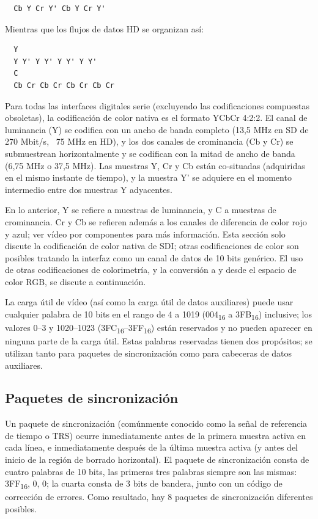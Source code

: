   \begin{verbatim}
  Cb Y Cr Y' Cb Y Cr Y'
  \end{verbatim}

  Mientras que los flujos de datos HD se organizan así:

  \begin{verbatim}
  Y
  Y Y' Y Y' Y Y' Y Y'
  C
  Cb Cr Cb Cr Cb Cr Cb Cr
  \end{verbatim}

  Para todas las interfaces digitales serie (excluyendo las codificaciones compuestas
  obsoletas), la codificación de color nativa es el formato YCbCr 4:2:2. El canal de
  luminancia (Y) se codifica con un ancho de banda completo (13,5 MHz en SD de 270 Mbit/s,
  ~75 MHz en HD), y los dos canales de crominancia (Cb y Cr) se submuestrean horizontalmente
  y se codifican con la mitad de ancho de banda (6,75 MHz o 37,5 MHz). Las muestras Y, Cr y
  Cb están co-situadas (adquiridas en el mismo instante de tiempo), y la muestra Y' se
  adquiere en el momento intermedio entre dos muestras Y adyacentes.

  En lo anterior, Y se refiere a muestras de luminancia, y C a muestras de crominancia. Cr y
  Cb se refieren además a los canales de diferencia de color rojo y azul; ver vídeo por
  componentes para más información. Esta sección solo discute la codificación de color nativa
  de SDI\@; otras codificaciones de color son posibles tratando la interfaz como un canal de
  datos de 10 bits genérico. El uso de otras codificaciones de colorimetría, y la conversión
  a y desde el espacio de color RGB, se discute a continuación.

  La carga útil de vídeo (así como la carga útil de datos auxiliares) puede usar cualquier
  palabra de 10 bits en el rango de 4 a 1019 (004\textsubscript{16} a 3FB\textsubscript{16})
  inclusive; los valores 0–3 y 1020–1023 (3FC\textsubscript{16}–3FF\textsubscript{16}) están
  reservados y no pueden aparecer en ninguna parte de la carga útil. Estas palabras reservadas
  tienen dos propósitos; se utilizan tanto para paquetes de sincronización como para cabeceras
  de datos auxiliares.

  \subsection{Paquetes de sincronización}

  Un paquete de sincronización (comúnmente conocido como la señal de referencia de tiempo o TRS)
  ocurre inmediatamente antes de la primera muestra activa en cada línea, e inmediatamente después
  de la última muestra activa (y antes del inicio de la región de borrado horizontal). El paquete
  de sincronización consta de cuatro palabras de 10 bits, las primeras tres palabras siempre son
  las mismas: 3FF\textsubscript{16}, 0, 0; la cuarta consta de 3 bits de bandera, junto con un código de corrección
  de errores. Como resultado, hay 8 paquetes de sincronización diferentes posibles.

